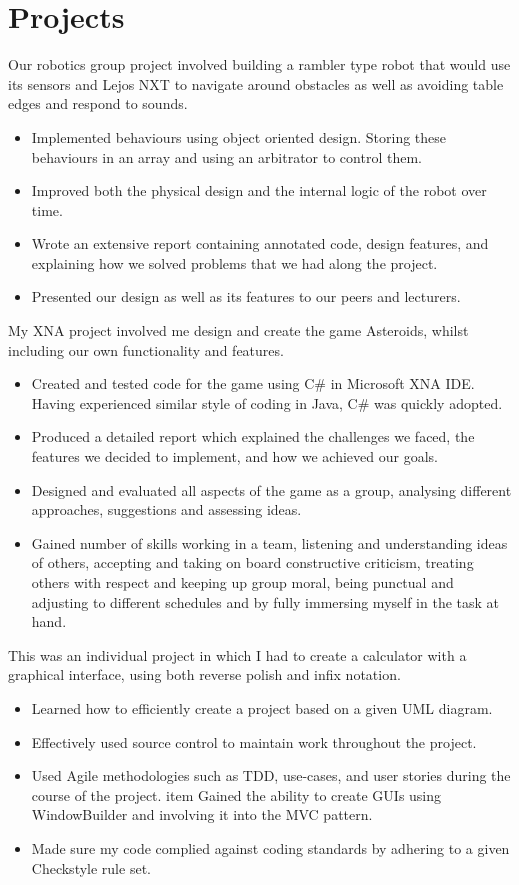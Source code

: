 \documentclass[10pt,a4paper]{moderncv}
\begin{document}
\section{Projects}
{
	Our robotics group project involved building a rambler type robot that would use its sensors and Lejos NXT to navigate around obstacles as well as avoiding table edges and respond to sounds.
	\begin{itemize}
		\item Implemented behaviours using object oriented design. Storing these behaviours in an array and using an arbitrator to control them.
		\item Improved both the physical design and the internal logic of the robot over time.
		\item Wrote an extensive report containing annotated code, design features, and explaining how we solved problems that we had along the project.
		\item Presented our design as well as its features to our peers and lecturers.
	\end{itemize}
}
{
	My XNA project involved me design and create the game Asteroids, whilst including our own functionality and features.
	\begin{itemize}
		\item Created and tested code for the game using C\# in Microsoft XNA IDE. Having experienced similar style of coding in Java, C\# was quickly adopted.
		\item Produced a detailed report which explained the challenges we faced, the features we decided to implement, and how we achieved our goals.
		\item Designed and evaluated all aspects of the game as a group, analysing different approaches, suggestions and assessing ideas.
		\item Gained number of skills working in a team, listening and understanding ideas of others, accepting and taking on board constructive criticism, treating others with respect and keeping up group moral, being punctual and adjusting to different schedules and by fully immersing myself in the task at hand.
	\end{itemize}
}
{
	This was an individual project in which I had to create a calculator with a graphical interface, using both reverse polish and infix notation.
	\begin{itemize}
		\item Learned how to efficiently create a project based on a given UML diagram.
		\item Effectively used source control to maintain work throughout the project.
		\item Used Agile methodologies such as TDD, use-cases, and user stories during the course of the project.
		item Gained the ability to create GUIs using WindowBuilder and involving it into the MVC pattern.
		\item Made sure my code complied against coding standards by adhering to a given Checkstyle rule set.
	\end{itemize}
}
\end{document}
